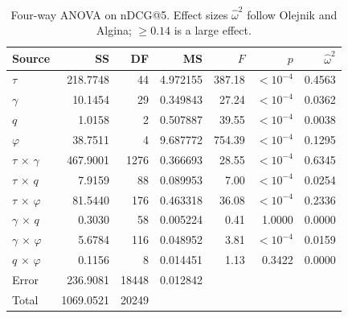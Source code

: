 \begin{table}
\centering
\caption{Four-way ANOVA on nDCG@5. Effect sizes $\hat{\omega}^2$ follow Olejnik and Algina; $\ge 0.14$ is a large effect.}
\label{tab:anova}
\begin{tabular}{lrrrrrr}
\toprule
Source & SS & DF & MS & $F$ & $p$ & $\hat{\omega}^2$ \\
\midrule
$\tau$ & 218.7748 & 44 & 4.972155 & 387.18 & $<10^{-4}$ & 0.4563 \\
$\gamma$ & 10.1454 & 29 & 0.349843 & 27.24 & $<10^{-4}$ & 0.0362 \\
$q$ & 1.0158 & 2 & 0.507887 & 39.55 & $<10^{-4}$ & 0.0038 \\
$\varphi$ & 38.7511 & 4 & 9.687772 & 754.39 & $<10^{-4}$ & 0.1295 \\
$\tau$ $\times$ $\gamma$ & 467.9001 & 1276 & 0.366693 & 28.55 & $<10^{-4}$ & 0.6345 \\
$\tau$ $\times$ $q$ & 7.9159 & 88 & 0.089953 & 7.00 & $<10^{-4}$ & 0.0254 \\
$\tau$ $\times$ $\varphi$ & 81.5440 & 176 & 0.463318 & 36.08 & $<10^{-4}$ & 0.2336 \\
$\gamma$ $\times$ $q$ & 0.3030 & 58 & 0.005224 & 0.41 & 1.0000 & 0.0000 \\
$\gamma$ $\times$ $\varphi$ & 5.6784 & 116 & 0.048952 & 3.81 & $<10^{-4}$ & 0.0159 \\
$q$ $\times$ $\varphi$ & 0.1156 & 8 & 0.014451 & 1.13 & 0.3422 & 0.0000 \\
\midrule
Error & 236.9081 & 18448 & 0.012842 &  &  &  \\
\midrule
Total & 1069.0521 & 20249 &  &  &  &  \\
\bottomrule
\end{tabular}
\end{table}